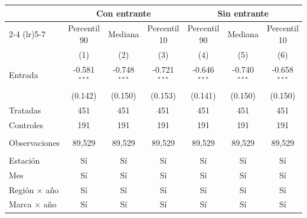 
\begingroup
\centering
\begin{tabular}{lcccccc}
   \toprule
    & \multicolumn{3}{c}{Con entrante} & \multicolumn{3}{c}{Sin entrante} \\ \cmidrule(lr){2-4} \cmidrule(lr){5-7}
                        & Percentil 90   & Mediana        & Percentil 10   & Percentil 90   & Mediana        & Percentil 10 \\   
                        & (1)            & (2)            & (3)            & (4)            & (5)            & (6)\\  
   \midrule 
   Entrada              & -0.581$^{***}$ & -0.748$^{***}$ & -0.721$^{***}$ & -0.646$^{***}$ & -0.740$^{***}$ & -0.658$^{***}$\\   
                        & (0.142)        & (0.150)        & (0.153)        & (0.141)        & (0.150)        & (0.150)\\   
   Tratadas             & 451            & 451            & 451            & 451            & 451            & 451\\  
   Controles            & 191            & 191            & 191            & 191            & 191            & 191\\  
    \\
   Observaciones        & 89,529         & 89,529         & 89,529         & 89,529         & 89,529         & 89,529\\  
    \\
   Estación             & Sí             & Sí             & Sí             & Sí             & Sí             & Sí\\  
   Mes                  & Sí             & Sí             & Sí             & Sí             & Sí             & Sí\\  
   Región $\times$ año  & Sí             & Sí             & Sí             & Sí             & Sí             & Sí\\  
   Marca $\times$ año   & Sí             & Sí             & Sí             & Sí             & Sí             & Sí\\  
   \bottomrule
\end{tabular}
\par\endgroup


